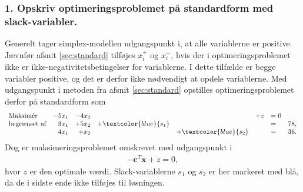 \subsubsection{1. Opskriv optimeringsproblemet på standardform med slack-variabler.}
%
Generelt tager simplex-modellen udgangspunkt i, at alle variablerne er positive. Jævnfør afsnit \ref{sec:standard} tilføjes $x_i^+$ og $x_i^-$, hvis der i optimeringsproblemet ikke er ikke-negativitetsbetingelser for variablerne. 
I dette tilfælde er begge variabler positive, og det er derfor ikke nødvendigt at opdele variablerne. 
Med udgangspunkt i metoden fra afsnit \ref{sec:standard} opstilles optimeringsproblemet derfor på standardform som
%
\begin{align*}
\begin{array}{lrrrrrlr}
\text{Maksimér}		& -5x_1 &-4x_2 &&& + z & =0\\
\text{begrænset af}	&3x_1& +5x_2	& + \textcolor{blue}{s_1} 	&&&= 	&78,\\
					&4x_1& + x_2	& & + \textcolor{blue}{s_2}	&&=	&	 36.\\
\end{array}
\end{align*}
Dog er maksimeringsproblemet omskrevet med udgangspunkt i 
\begin{align*}
-\textbf{c}^T\textbf{x} + z	 =0,
\end{align*}
hvor $z$ er den optimale værdi. 
%
Slack-variablerne $s_1$ og $s_2$ er her markeret med blå, da de i sidste ende ikke tilføjes til løsningen. 
%
